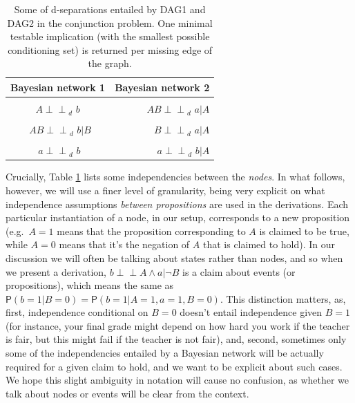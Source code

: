 \documentclass[
  10pt,
  dvipsnames,enabledeprecatedfontcommands]{scrartcl}
\newcommand{\indep}{\!\perp \!\!\! \perp\!}
\newcommand{\n}{\neg}
\newcommand{\et}{\wedge}
\newcommand{\pr}[1]{\ensuremath{\mathsf{P}(#1)}}
\begin{document}
\begin{table}[h]
\begin{tabular}{cr}
\toprule
Bayesian network 1  & Bayesian network 2\\
\midrule
\cellcolor{gray!6}{$A   \indep_d\,\, B  $}&\cellcolor{gray!6}{     $ A  \indep_d\,\, b \vert  B  $} \\
$A   \indep_d\,\, b  $& $AB  \indep_d\,\,  a \vert  A$\\
\cellcolor{gray!6}{$\,\,\, AB  \indep_d\,\, a \vert A $}  & \cellcolor{gray!6}{$AB  \indep_d\,\,  b \vert  B $}\\
$\,\,\, AB  \indep_d\,\, b \vert B  $ & $ B  \indep_d\,\,  a \vert  A $\\
\cellcolor{gray!6}{$B   \indep_d\,\, a $}        & \cellcolor{gray!6}{$a  \indep_d\,\,  b \vert  B$ }\\
$\,\, a    \indep_d\,\, b$    & $a  \indep_d\,\,  b \vert  A $ \\
\bottomrule
\end{tabular}
\caption{Some of d-separations entailed by \textsf{DAG1} and \textsf{DAG2} in the conjunction problem. One minimal testable implication (with the smallest possible conditioning set) is returned per missing edge of the graph.} 
\label{tab:indepBNS}
\end{table}

Crucially, Table \ref{tab:indepBNS} lists some independencies between
the \emph{nodes}. In what follows, however, we will use a finer level of
granularity, being very explicit on what independence assumptions
\emph{between propositions} are used in the derivations. Each particular
instantiation of a node, in our setup, corresponds to a new proposition
(e.g.~\(A = 1\) means that the proposition corresponding to \(A\) is
claimed to be true, while \(A = 0\) means that it's the negation of
\(A\) that is claimed to hold). In our discussion we will often be
talking about states rather than nodes, and so when we present a
derivation, \mbox{$b\indep A \et a \vert \n B$} is a claim about events
(or propositions), which means the same as
\(\pr{b = 1 \vert B = 0} = \pr{b = 1 \vert A = 1, a = 1, B = 0}\). This
distinction matters, as, first, independence conditional on \(B= 0\)
doesn't entail independence given \(B=1\) (for instance, your final
grade might depend on how hard you work if the teacher is fair, but this
might fail if the teacher is not fair), and, second, sometimes only some
of the independencies entailed by a Bayesian network will be actually
required for a given claim to hold, and we want to be explicit about
such cases. We hope this slight ambiguity in notation will cause no
confusion, as whether we talk about nodes or events will be clear from
the context.
\end{document}
